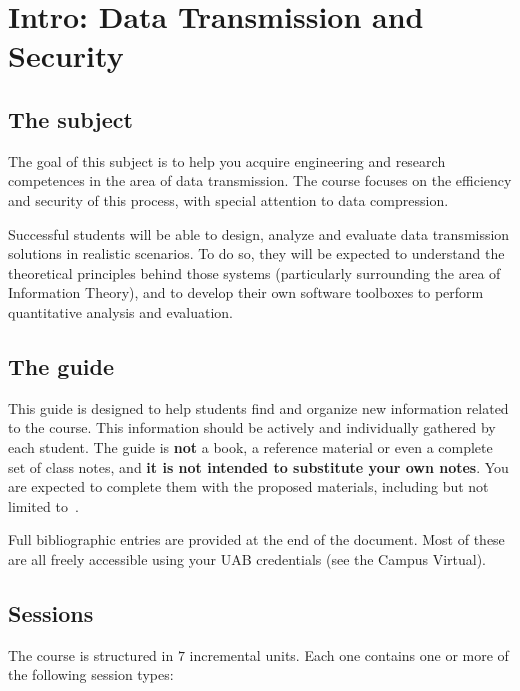 

\chapter{Intro: Data Transmission and Security}\label{sec:course}

\section*{The subject}

The goal of this subject is to help you acquire engineering and research competences
in the area of data transmission.
%
The course focuses on the efficiency and security
of this process, with special attention to data compression.

Successful students will be able to design, analyze and evaluate data transmission solutions
in realistic scenarios. To do so, they will be expected to understand the theoretical
principles behind those systems (particularly surrounding the area of Information Theory),
and to develop their own software toolboxes to perform quantitative analysis and evaluation.


\section*{The guide}
This guide is designed to help students find and organize new information related to the course.
This information should be actively and individually gathered by each student.
%
The guide is \textbf{not} a book, a reference material or even a complete set of class notes, and
\textbf{it is not intended to substitute your own notes}. You are expected to complete them with
the proposed materials, including but not limited to~\cite{sayood_introduction,taubman2002jpeg2000,mcanlis_understanding}.

\begin{remark}
    Full bibliographic entries are provided at the end of the document.
    Most of these are all freely accessible using your UAB credentials (see the Campus Virtual).
\end{remark}

\section*{Sessions}

The course is structured in $7$ incremental units. Each one contains one or more of the following session types:


